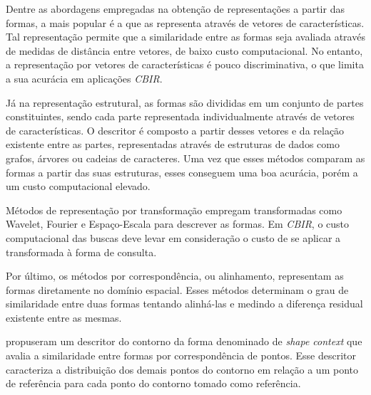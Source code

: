 Dentre as abordagens empregadas na obtenção de representações a partir das formas, a mais popular é a que as representa através de vetores de características. Tal representação permite que a similaridade entre as formas seja avaliada através de medidas de distância entre vetores, de baixo custo computacional. No entanto, a representação por vetores de características é pouco discriminativa, o que limita a sua acurácia em aplicações \emph{CBIR}.

Já na representação estrutural, as formas são divididas em um conjunto de partes constituintes, sendo cada parte representada individualmente através de vetores de características. O descritor é composto a partir desses vetores e da relação existente entre as partes, representadas através de estruturas de dados como grafos, árvores ou cadeias de caracteres. Uma vez que esses métodos comparam as formas a partir das suas estruturas, esses conseguem uma boa acurácia, porém a um custo computacional elevado.

Métodos de representação por transformação empregam transformadas como Wavelet, Fourier e Espaço-Escala para descrever as formas. Em \emph{CBIR}, o custo computacional das buscas deve levar em consideração o custo de se aplicar a transformada à forma de consulta. 

Por último, os métodos por correspondência, ou alinhamento, representam as formas diretamente no domínio espacial. Esses métodos determinam o grau de similaridade entre duas formas tentando alinhá-las e medindo a diferença residual existente entre as mesmas.

 propuseram um descritor do contorno da forma denominado de \emph{shape context} que avalia a similaridade entre formas por correspondência de pontos. Esse descritor caracteriza a distribuição dos demais pontos do contorno em relação a um ponto de referência para cada ponto do contorno tomado como referência. 


